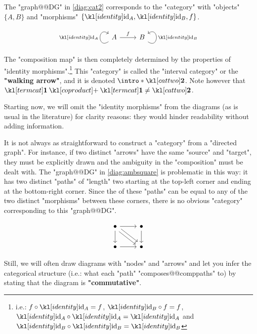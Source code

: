 \documentclass[main.tex]{subfiles}
\begin{document}
\begin{exmps}
	The "graph@@DG" in \eqref{diag:cat2} corresponds to the "category" with "objects" $\{A, B\}$ and "morphisms" $\{\id_A, \id_B, f\}$.
	\begin{equation}\label{diag:cat2}
		\begin{tikzcd}
			A \arrow[r, "f"] \arrow["\id_A", loop, distance=2em, in=145, out=215] & B \arrow["\id_B"', loop, distance=2em, in=35, out=325]
		\end{tikzcd}
	\end{equation}
	The "composition map" is then completely determined by the properties of "identity morphisms".\footnote{i.e.: $f \circ \id_A = f$, $\id_B \circ f = f$, $\id_A \circ \id_A = \id_A$ and $\id_B \circ \id_B = \id_B$} \AP This "category" is called the "interval category" or the \textbf{"walking arrow"}, and it is denoted $\intro*\cattwo$. Note however that $\termcat \coproduct \termcat \neq \cattwo$.
	
	Starting now, we will omit the "identity morphisms" from the diagrams (as is usual in the literature) for clarity reasons: they would hinder readability without adding information.
	
	It is not always as straightforward to construct a "category" from a "directed graph". For instance, if two distinct "arrows" have the same "source" and "target", they must be explicitly drawn and the ambiguity in the "composition" must be dealt with. The "graph@@DG" in \eqref{diag:ambsquare} is problematic in this way: it has two distinct "paths" of "length" two starting at the top-left corner and ending at the bottom-right corner. Since the  of these "paths" can be equal to any of the two distinct "morphisms" between these corners, there is no obvious "category" corresponding to this "graph@@DG".\begin{marginfigure}[-5\baselineskip]\begin{equation}\label{diag:ambsquare}\begin{tikzcd}
		\bullet \arrow[r] \arrow[d] \arrow[rd, shift left] \arrow[rd, shift right] & \bullet \arrow[d] \\
		\bullet \arrow[r]                                                          & \bullet          
		\end{tikzcd}\end{equation}\end{marginfigure}
	Still, we will often draw diagrams with "nodes" and "arrows" and let you infer the categorical structure (i.e.: what each "path" "composes@@comppaths" to) by stating that the diagram is \textbf{"commutative"}.
\end{exmps}
\end{document}
